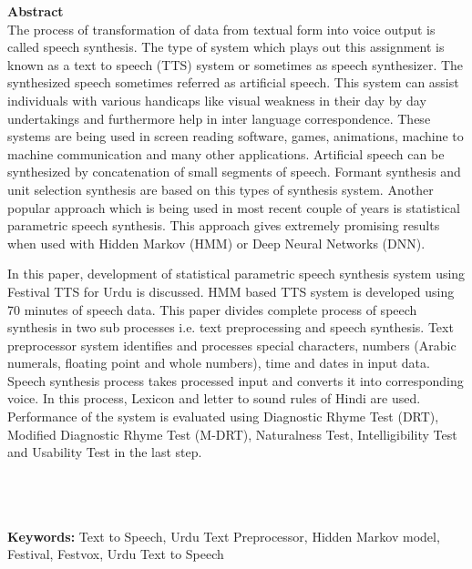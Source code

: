 
{\LARGE\textbf {Abstract}} \\ %
The process of transformation of data from textual form into voice output is called speech synthesis. The type of system which plays out this assignment is known as a text to speech (TTS) system or sometimes as speech synthesizer. The synthesized speech sometimes referred as artificial speech. This system can assist individuals with various handicaps like visual weakness in their day by day undertakings and furthermore help in inter language correspondence. These systems are being used in screen reading software, games, animations, machine to machine communication and many other applications. Artificial speech can be synthesized by concatenation of small segments of speech. Formant synthesis and unit selection synthesis are based on this types of synthesis system. Another popular approach which is being used in most recent couple of years is statistical parametric speech synthesis. This approach gives extremely promising results when used with Hidden Markov (HMM) or Deep Neural Networks (DNN).

In this paper, development of statistical parametric speech synthesis system using Festival TTS for Urdu is discussed. HMM based TTS system is developed using 70 minutes of speech data. This paper divides complete process of speech synthesis in two sub processes i.e. text preprocessing and speech synthesis. Text preprocessor system identifies and processes special characters, numbers (Arabic numerals, floating point and whole numbers), time and dates in input data. Speech synthesis process takes processed input and converts it into corresponding voice. In this process, Lexicon and letter to sound rules of Hindi are used. Performance of the system is evaluated using Diagnostic Rhyme Test (DRT), Modified Diagnostic Rhyme Test (M-DRT), Naturalness Test, Intelligibility Test and Usability Test in the last step.


\\ \\ \\
\textbf{Keywords:}
Text to Speech, Urdu Text Preprocessor, Hidden Markov model, Festival, Festvox, Urdu Text to Speech
